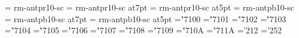 \def\fourteencaps{\font\fzzozznzzt=    rm-antpr10-sc at14pt \fzzozznzzt}%
\def\twelvecaps{\font\fzzozznzzt=   rm-antpr12-sc  \fzzozznzzt}%
\font\caps=            rm-antpr10-sc
\def\ninecaps{\font\fzzozznzzt=        rm-antpr10-sc at9pt \fzzozznzzt}%
\def\eightcaps{\font\fzzozznzzt=       rm-antpr8-sc \fzzozznzzt}%
\font\sevencaps=       rm-antpr10-sc at7pt
\def\sixcaps{\font\fzzozznzzt=         rm-antpr6-sc \fzzozznzzt}%
\font\fivecaps=        rm-antpr10-sc at5pt
%
\def\twentycapsbf{\font\fzzozznzzt=   rm-antpb10-sc at20pt \fzzozznzzt}%
\def\eighteencapsbf{\font\fzzozznzzt= rm-antpb10-sc at18pt \fzzozznzzt}%
\def\sixteencapsbf{\font\fzzozznzzt=  rm-antpb10-sc at16pt \fzzozznzzt}%
\def\fourteencapsbf{\font\fzzozznzzt=    rm-antpb10-sc at14pt \fzzozznzzt}%
\def\twelvecapsbf{\font\fzzozznzzt=   rm-antpb12-sc \fzzozznzzt}%
\font\capsbf=            rm-antpb10-sc
\def\ninecapsbf{\font\fzzozznzzt=        rm-antpb10-sc at9pt \fzzozznzzt}%
\def\eightcapsbf{\font\fzzozznzzt=       rm-antpb8-sc \fzzozznzzt}%
\font\sevencapsbf=       rm-antpb10-sc at7pt
\def\sixcapsbf{\font\fzzozznzzt=         rm-antpb6-sc \fzzozznzzt}%
\font\fivecapsbf=        rm-antpb10-sc at5pt
%
\mathchardef\Gamma="7100
\mathchardef\Delta="7101
\mathchardef\Theta="7102
\mathchardef\Lambda="7103
\mathchardef\Xi="7104
\mathchardef\Pi="7105
\mathchardef\Sigma="7106
\mathchardef\Upsilon="7107
\mathchardef\Phi="7108
\mathchardef\Psi="7109
\mathchardef\Omega="710A
\mathchardef\varrho="711A
%
\chardef\Lstroke='212%
\chardef\lstroke='252%
%
\rm